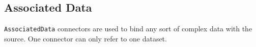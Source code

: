 \documentclass[11pt,a4paper]{ivoa}
\begin{document}



\subsection{Associated Data}
\texttt{AssociatedData} connectors are used to bind any sort of complex data with the source.
One connector can only refer to one dataset.
\end{document}
